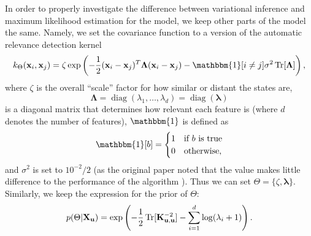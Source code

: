 \documentclass{mprop}
\theoremstyle{definition}
\DeclareMathOperator{\Tr}{Tr}
\DeclareMathOperator{\diag}{diag}
\begin{document}

In order to properly investigate the difference between variational inference
and maximum likelihood estimation for the model, we keep other parts of the
model the same. Namely, we set the covariance function to a version of the
automatic relevance detection kernel
\cite{DBLP:conf/nips/LevinePK11,neal2012bayesian}
\[ k_\Theta(\mathbf{x}_i, \mathbf{x}_j) = \zeta\exp\left(
    -\frac{1}{2}(\mathbf{x}_i - \mathbf{x}_j)^T\bm\Lambda(\mathbf{x}_i -
    \mathbf{x}_j) - \mathbbm{1}[i \ne j]\sigma^2\Tr[\bm\Lambda] \right), \]
where $\zeta$ is the overall ``scale'' factor for how similar or distant the
states are,
\[ \bm\Lambda = \diag(\lambda_1, \dots, \lambda_d) = \diag(\bm\lambda) \]
is a diagonal matrix that determines how relevant each feature is (where $d$
denotes the number of features), $\mathbbm{1}$ is defined as
\[ \mathbbm{1}[b] = \begin{cases}
    1 & \mbox{if $b$ is true} \\
    0 & \mbox{otherwise},
  \end{cases} \]
and $\sigma^2$ is set to $10^{-2}/2$ (as the original paper noted that
the value makes little difference to the performance of the algorithm
\cite{DBLP:conf/nips/LevinePK11}). Thus we can set $\Theta = \{ \zeta,
\bm\lambda \}$. Similarly, we keep the expression for the prior of $\Theta$:
\[ p(\Theta | \mathbf{X_u}) = \exp\left( -\frac{1}{2}\Tr[\Kuu^{-2}] -
    \sum_{i=1}^d \log(\lambda_i + 1) \right). \]
\end{document}
